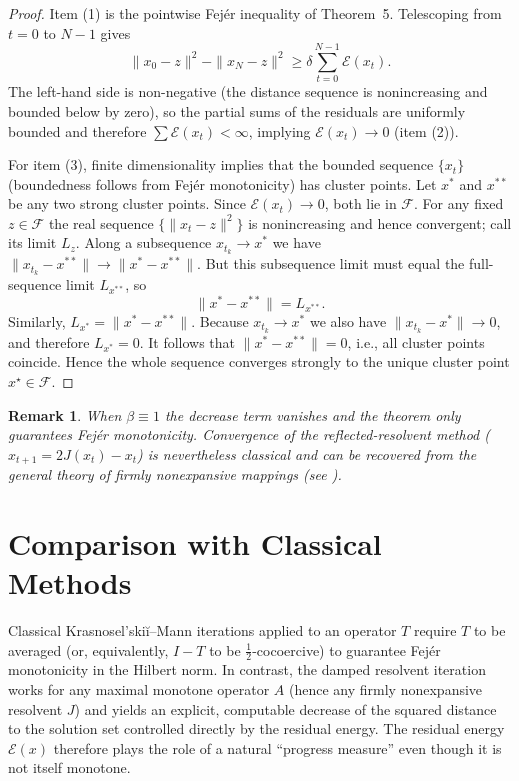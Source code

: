 \documentclass{article}
\newtheorem{remark}{Remark}
\begin{document}
\begin{proof}
Item (1) is the pointwise Fejér inequality of Theorem~5. Telescoping from \(t=0\) to \(N-1\) gives
\[
\|x_0 - z\|^2 - \|x_N - z\|^2 \ge \delta \sum_{t=0}^{N-1} \mathcal{E}(x_t).
\]
The left-hand side is non-negative (the distance sequence is nonincreasing and bounded below by zero), so the partial sums of the residuals are uniformly bounded and therefore \(\sum \mathcal{E}(x_t) < \infty\), implying \(\mathcal{E}(x_t) \to 0\) (item (2)).

For item (3), finite dimensionality implies that the bounded sequence \(\{x_t\}\) (boundedness follows from Fejér monotonicity) has cluster points. Let \(x^*\) and \(x^{**}\) be any two strong cluster points. Since \(\mathcal{E}(x_t) \to 0\), both lie in \(\mathcal{F}\). For any fixed \(z \in \mathcal{F}\) the real sequence \(\{\|x_t - z\|^2\}\) is nonincreasing and hence convergent; call its limit \(L_z\). Along a subsequence \(x_{t_k} \to x^*\) we have \(\|x_{t_k} - x^{**}\| \to \|x^* - x^{**}\|\). But this subsequence limit must equal the full-sequence limit \(L_{x^{**}}\), so
\[
\|x^* - x^{**}\| = L_{x^{**}}.
\]
Similarly, \(L_{x^*} = \|x^* - x^{**}\|\). Because \(x_{t_k} \to x^*\) we also have \(\|x_{t_k} - x^*\| \to 0\), and therefore \(L_{x^*} = 0\). It follows that \(\|x^* - x^{**}\| = 0\), i.e., all cluster points coincide. Hence the whole sequence converges strongly to the unique cluster point \(x^\star \in \mathcal{F}\).
\end{proof}

\begin{remark}
When \(\beta \equiv 1\) the decrease term vanishes and the theorem only guarantees Fejér monotonicity. Convergence of the reflected-resolvent method (\(x_{t+1} = 2J(x_t) - x_t\)) is nevertheless classical and can be recovered from the general theory of firmly nonexpansive mappings (see \cite[Chapter~4]{bauschke2011convex}).
\end{remark}

\section{Comparison with Classical Methods}

Classical Krasnosel'ski\u{i}--Mann iterations applied to an operator \(T\) require \(T\) to be averaged (or, equivalently, \(I - T\) to be \(\frac{1}{2}\)-cocoercive) to guarantee Fejér monotonicity in the Hilbert norm. In contrast, the damped resolvent iteration works for any maximal monotone operator \(A\) (hence any firmly nonexpansive resolvent \(J\)) and yields an explicit, computable decrease of the squared distance to the solution set controlled directly by the residual energy. The residual energy \(\mathcal{E}(x)\) therefore plays the role of a natural ``progress measure'' even though it is not itself monotone.
\end{document}
